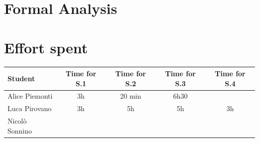 \documentclass[table, 12pt]{article}
\begin{document}
\section{Formal Analysis}
\newpage
\section{Effort spent}
\begin{tabular}{ | l || c | c | c | c |}
    \hline
    Student        & Time for S.1 & Time for S.2 & Time for S.3 & Time for S.4 \\ \hline
    Alice Piemonti & 3h           & 20 min       & 6h30         &              \\ \hline
    Luca Pirovano  & 3h           & 5h           & 5h           & 3h           \\ \hline
    Nicolò Sonnino &              &              &              &              \\
    \hline
\end{tabular}
\end{document}
